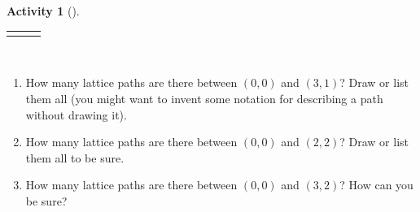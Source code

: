 \documentclass[10pt,]{book}
\theoremstyle{plain}
\theoremstyle{definition}
\theoremstyle{definition}
\theoremstyle{definition}
\newtheorem{activity}[project]{Activity}
\numberwithin{equation}{chapter}
\newlength{\panelmax}
\begin{document}
\begin{activity}[]
{\ifdefined\panelboxCimage\else\newsavebox{\panelboxCimage}\fi%
\begin{lrbox}{\panelboxCimage}
\end{lrbox}
\ifdefined\phCimage\else\newlength{\phCimage}\fi%
\setlength{\phCimage}{\ht\panelboxCimage+\dp\panelboxCimage}
\settototalheight{\phCimage}{\usebox{\panelboxCimage}}
\setlength{\panelmax}{\maxof{\panelmax}{\phCimage}}
\leavevmode%
\setlength{\tabcolsep}{0.0166666666666667\linewidth}
\par\medskip\noindent
\hspace*{0.0166666666666667\linewidth}%
\begin{tabular}{@{}*{3}{c}@{}}
\begin{minipage}[c][\panelmax][t]{0.3\linewidth}\usebox{\panelboxAimage}\end{minipage}&
\begin{minipage}[c][\panelmax][t]{0.3\linewidth}\usebox{\panelboxBimage}\end{minipage}&
\begin{minipage}[c][\panelmax][t]{0.3\linewidth}\usebox{\panelboxCimage}\end{minipage}\end{tabular}\\
}%
\begin{enumerate}[font=\bfseries,label=(\alph*),ref=\alph*]
\item\label{task-76} \hypertarget{p-485}{}%
How many lattice paths are there between \((0,0)\) and \((3,1)\)?  Draw or list them all (you might want to invent some notation for describing a path without drawing it).%
\item\label{task-77} \hypertarget{p-486}{}%
How many lattice paths are there between \((0,0)\) and \((2,2)\)? Draw or list them all to be sure.%
\item\label{task-78} \hypertarget{p-487}{}%
How many lattice paths are there between \((0,0)\) and \((3,2)\)? How can you be sure?%
\end{enumerate}
\end{activity}
\end{document}
